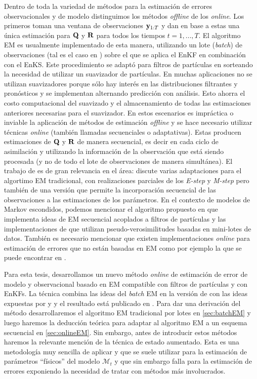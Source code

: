 Dentro de toda la variedad de métodos para la estimación de errores observacionales y de modelo distinguimos los métodos \textit{offline} de los \textit{online}. Los primeros toman una ventana de observaciones $\mathbf{y}_{1:T}$ y dan en base a estas una única estimación para $\mathbf{Q}$ y $\mathbf{R}$ para todos los tiempos $t = 1, ..., T$. El algoritmo EM es usualmente implementado de esta manera, utilizando un lote (\textit{batch}) de observaciones (tal es el caso en \cite{Dreano2017, Tandeo2015, Pulido2018}) sobre el que se aplica el EnKF en combinación con el EnKS. Este procedimiento se adaptó para filtros de partículas en \cite{Lucini2021} sorteando la necesidad de utilizar un suavizador de partículas. En muchas aplicaciones no se utilizan suavizadores porque sólo hay interés en las distribuciones filtrantes y pronósticos y se implementan alternando predicción con análisis. Esto ahorra el costo computacional del suavizado y el almacenamiento de todas las estimaciones anteriores necesarias para el suavizador. En estos escenarios es impráctica o inviable la aplicación de métodos de estimación \textit{offline} y se hace necesario utilizar técnicas \textit{online} (también llamadas secuenciales o adaptativas). Estas producen estimaciones de $\mathbf{Q}$ y $\mathbf{R}$ de manera secuencial, es decir en cada ciclo de asimilación y utilizando la información de la observación que está siendo procesada (y no de todo el lote de observaciones de manera simultánea). El trabajo de \cite{Neal1998} es de gran relevancia en el área: discute varias adaptaciones para el algortimo EM tradicional, con realizaciones parciales de los \textit{E-step} y \textit{M-step} pero también de una versión que permite la incorporación secuencial de las observaciones a las estimaciones de los parámetros. En el contexto de modelos de Markov escondidos, podemos mencionar el algoritmo propuesto en \cite{Cappe2009} que implementa ideas de EM secuencial acoplados a filtros de partículas y las implementaciones de \cite{Andrieu2003} que utilizan pseudo-verosimilitudes basadas en mini-lotes de datos. También es necesario mencionar que existen implementaciones \textit{online} para estimación de errores que no están basadas en EM como por ejemplo la que se puede encontrar en \cite{Berry2013}.

Para esta tesis, desarrollamos un nuevo método \textit{online} de estimación de error de modelo y observacional basado en EM compatible con filtros de partículas y con EnKFs. La técnica combina las ideas del \textit{batch} EM en la versión de \cite{Dreano2017} con las ideas expuestas por \cite{Cappe2009} y \cite{Andrieu2003} y el resultado está publicado en \cite{Cocucci2021}. Para dar una derivación del método desarrollaremos el algoritmo EM tradicional por lotes en \ref{sec:batchEM} y luego haremos la deducción teórica para adaptar al algoritmo EM a un esquema secuencial en \ref{sec:onlineEM}. Sin embargo, antes de introducir estos métodos haremos la relevante mención de la técnica de estado aumentado. Esta es una metodología muy sencilla de aplicar y que se suele utilizar para la estimación de parámetros ``físicos'' del modelo $\mathcal{M}_t$ y que sin embargo falla para la estimación de errores exponiendo la necesidad de tratar con métodos más involucrados.

